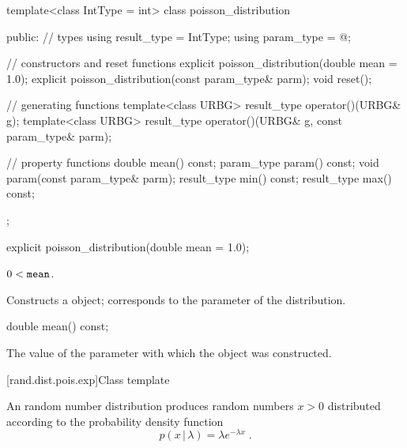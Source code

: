 %
\begin{codeblock}
template<class IntType = int>
  class poisson_distribution
  {
  public:
    // types
    using result_type = IntType;
    using param_type  = @\unspec@;

    // constructors and reset functions
    explicit poisson_distribution(double mean = 1.0);
    explicit poisson_distribution(const param_type& parm);
    void reset();

    // generating functions
    template<class URBG>
      result_type operator()(URBG& g);
    template<class URBG>
      result_type operator()(URBG& g, const param_type& parm);

    // property functions
    double mean() const;
    param_type param() const;
    void param(const param_type& parm);
    result_type min() const;
    result_type max() const;
  };
\end{codeblock}

%
\begin{itemdecl}
explicit poisson_distribution(double mean = 1.0);
\end{itemdecl}

\begin{itemdescr}
\pnum\requires
 $ 0 < \texttt{\protect mean} $.

\pnum\effects Constructs a  object;
 corresponds to the parameter of the distribution.
\end{itemdescr}

%
\begin{itemdecl}
double mean() const;
\end{itemdecl}

\begin{itemdescr}
\pnum\returns The value of the  parameter
 with which the object was constructed.
\end{itemdescr}


[rand.dist.pois.exp]{Class template }%
%
%

\pnum
An  random number distribution
produces random numbers $x > 0$
distributed according to
the probability density function%
%
%
\[%
 p(x\,|\,\lambda)
      = \lambda e^{-\lambda x}
\; \mbox{.}
\]

